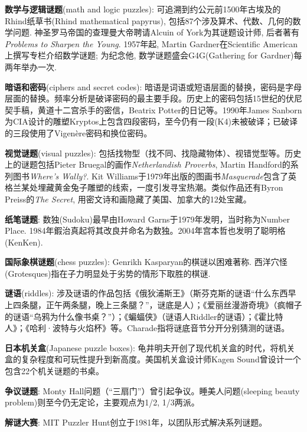 \par \textbf{数学与逻辑谜题}(math and logic puzzles): 可追溯到约公元前1500年古埃及的Rhind纸草书(Rhind mathematical papyrus), 包括87个涉及算术、代数、几何的数学问题. 神圣罗马帝国的查理曼大帝聘请Alcuin of York为其谜题设计师, 后者著有\textit{Problems to Sharpen the Young}. 1957年起, Martin Gardner在Scientific American上撰写专栏介绍数学谜题; 为纪念他, 数学谜题盛会G4G(Gathering for Gardner)每两年举办一次. 

\par \textbf{暗语和密码}(ciphers and secret codes): 暗语是词语或短语层面的替换，密码是字母层面的替换。频率分析是破译密码的最主要手段。历史上的密码包括15世纪的伏尼契手稿，黄道十二宫杀手的密信，Beatrix Potter的日记等。1990年James Sanborn为CIA设计的雕塑Kryptos上包含四段密码，至今仍有一段(K4)未被破译；已破译的三段使用了Vigenère密码和换位密码。

\par \textbf{视觉谜题}(visual puzzles): 包括找物型（找不同、找隐藏物体）、视错觉型等。历史上的谜题包括Pieter Bruegal的画作\emph{Netherlandish Proverbs}, Martin Handford的系列图书\emph{Where's Wally?}. Kit Williams于1979年出版的图画书\emph{Masquerade}包含了英格兰某处埋藏黄金兔子雕塑的线索，一度引发寻宝热潮。类似作品还有Byron Preiss的\emph{The Secret}, 用密文诗和画隐藏了美国、加拿大的12处宝藏。

\par \textbf{纸笔谜题}: 数独(Sudoku)最早由Howard Garns于1979年发明，当时称为Number Place. 1984年{鍜}治真起将其改良并命名为数独。2004年宫本哲也发明了聪明格(KenKen). 

\par \textbf{国际象棋谜题}(chess puzzles): Genrikh Kasparyan的棋谜以困难著称. 西洋穴怪(Grotesques)指在子力明显处于劣势的情形下取胜的棋谜. 

\par \textbf{谜语}(riddles): 涉及谜语的作品包括《俄狄浦斯王》（斯芬克斯的谜语“什么东西早上四条腿，正午两条腿，晚上三条腿？”，谜底是人）；《爱丽丝漫游奇境》（疯帽子的谜语“乌鸦为什么像书桌？”）；《蝙蝠侠》（谜语人Riddler的谜语）；《霍比特人》；《哈利·波特与火焰杯》等。Charade指将谜底音节分开分别猜测的谜语。

\par \textbf{日本机关盒}(Japanese puzzle boxes): 龟井明夫开创了现代机关盒的时代，将机关盒的复杂程度和可玩性提升到新高度。美国机关盒设计师Kagen Sound曾设计一个包含22个机关谜题的书桌。

\par \textbf{争议谜题}: Monty Hall问题（“三扇门”）曾引起争议。睡美人问题(sleeping beauty problem)则至今仍无定论，主要观点为1/2, 1/3两派。

\par \textbf{解谜大赛}: MIT Puzzler Hunt创立于1981年，以团队形式解决系列谜题。
